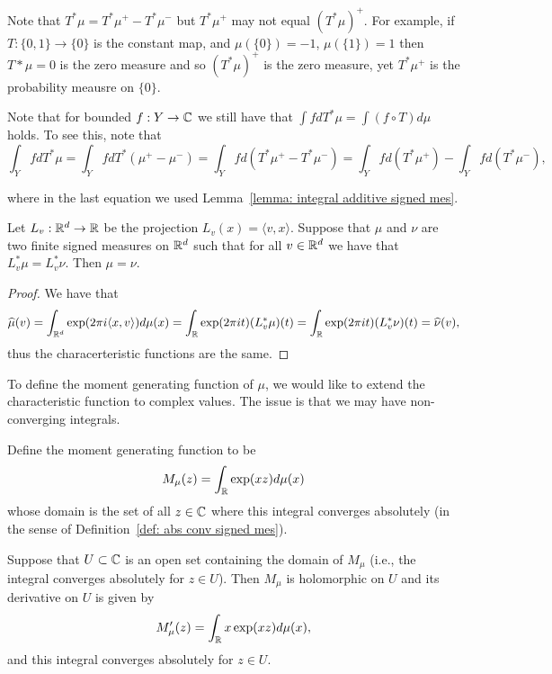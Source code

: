 \documentclass[twoside, a4paper, 10pt]{amsart}
\begin{document}
\begin{eg}[Warning!!] Note that $T^*\mu = T^*\mu^+ - T^*\mu^-$ but $T^*\mu^+$ may not  equal $(T^*\mu)^+$. For example, if $T:\{0,1\} \to \{0\}$ is the constant map, and $\mu(\{0\}) = -1$, $\mu(\{1\}) = 1$ then $T*\mu = 0$ is the zero measure and so $(T^*\mu)^+$ is the zero measure, yet $T^*\mu^+$ is the probability meausre on $\{0\}$. \end{eg}

Note that for bounded $f:Y \to \mathbb{C}$ we still have that $\int f dT^*\mu = \int (f \circ T) d\mu$ holds. To see this, note that
$$\int_Y f dT^*\mu = \int_Y f dT^*(\mu^+ - \mu^-) = \int_Y f d(T^*\mu^+ - T^*\mu^-) = \int_Y f d(T^*\mu^+) - \int_Y f d(T^*\mu^-), $$

where in the last equation we used Lemma~\ref{lemma: integral additive signed mes}.

\begin{corol}\label{corol: mu projections unique} Let $L_v:\mathbb{R}^d \to \mathbb{R}$ be the projection $L_v(x) = \langle v, x \rangle$. Suppose that $\mu$ and $\nu$ are two finite signed measures on $\mathbb{R}^d$ such that for all $v \in \mathbb{R}^d$ we have that $L_v^* \mu = L_v^* \nu$. Then $\mu = \nu$.

\end{corol}

\begin{proof} We have that $$\widehat{\mu}(v) = \int_{\mathbb{R}^d} \exp(2\pi i \langle x, v \rangle) d\mu(x) = \int_{\mathbb{R}} \exp(2\pi i t) (L_v^*\mu) (t) = \int_{\mathbb{R}} \exp (2\pi i t) (L_v^*\nu)(t) = \widehat{\nu}(v),$$ thus the characerteristic functions are the same. \end{proof}

To define the moment generating function of $\mu$, we would like to extend the characteristic function to complex values. The issue is that we may have non-converging integrals. 

Define the moment generating function to be $$M_{\mu}(z) = \int_{\mathbb{R}} \exp(xz) d\mu(x)$$ whose domain is the set of all $z \in \mathbb{C}$ where this integral converges absolutely (in the sense of Definition~\ref{def: abs conv signed mes}).

\begin{prop} 
Suppose that $U \subset \mathbb{C}$ is an open set containing the domain of $M_{\mu}$ (i.e., the integral converges absolutely for $z \in U$). Then $M_{\mu}$ is holomorphic on $U$ and its derivative on $U$ is given by $$M_{\mu}'(z) = \int_{\mathbb{R}} x\exp(xz) d\mu(x),$$ and this integral converges absolutely for $z \in U$.

\end{prop}
\end{document}
